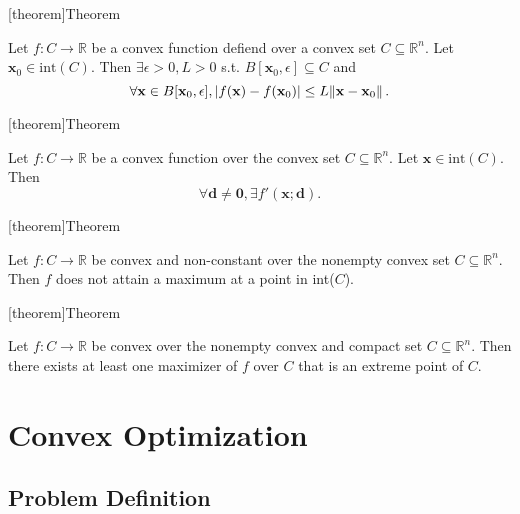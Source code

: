 \documentclass[12pt]{report}
\theoremstyle{definition}
\begin{document}
[theorem]{Theorem}
\begin{continuity of convex functions}
    Let $f:C\rightarrow\mathbb{R}$ be a convex function defiend over a convex
    set $C\subseteq\mathbb{R}^{n}$. Let $\mathbf{x}_0\in\text{int}(C)$. Then
    $\exists\epsilon>0,L>0$ s.t. $B[\mathbf{x}_0,\epsilon]\subseteq C$ and
    \[
        \forall \mathbf{x}\in B[\mathbf{x}_0,\epsilon],
        |f(\mathbf{x})-f(\mathbf{x}_0)|\le L\norm{\mathbf{x}-\mathbf{x}_0}.
    \]
\end{continuity of convex functions}

[theorem]{Theorem}
\begin{existence of directional derivative of convex function}
    Let $f:C\rightarrow\mathbb{R}$ be a convex function over the convex set
    $C\subseteq\mathbb{R}^{n}$. Let $\mathbf{x}\in\text{int}(C)$. Then
    \[
        \forall \mathbf{d}\neq\mathbf{0}, \exists f'(\mathbf{x};\mathbf{d}).
    \]
\end{existence of directional derivative of convex function}

[theorem]{Theorem}
\begin{no maximum inside the convex set}
    Let $f:C\rightarrow\mathbb{R}$ be convex and non-constant over the nonempty
    convex set $C\subseteq\mathbb{R}^{n}$. Then $f$ does not attain a maximum at
    a point in int($C$).
\end{no maximum inside the convex set}

[theorem]{Theorem}
\begin{maximum of a convex function over a compact convex set}
    Let $f:C\rightarrow\mathbb{R}$ be convex over the nonempty convex and
    compact set $C\subseteq\mathbb{R}^{n}$. Then there exists at least one
    maximizer of $f$ over $C$ that is an extreme point of $C$.
\end{maximum of a convex function over a compact convex set}


\chapter{Convex Optimization}

\section{Problem Definition}
\end{document}
